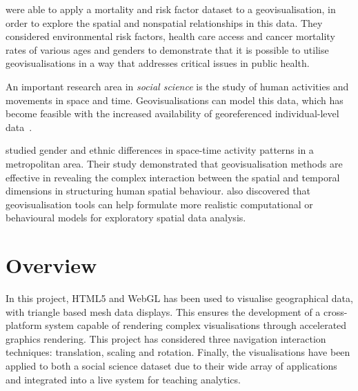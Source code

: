 {	\textcite{maceachren2004geovisualization} were able to apply a mortality and risk factor dataset to a geovisualisation, in order to explore the spatial and nonspatial relationships in this data. They considered environmental risk factors, health care access and cancer mortality rates of various ages and genders to demonstrate that it is possible to utilise geovisualisations in a way that addresses critical issues in public health.

	An important research area in \emph{social science} is the study of human activities and movements in space and time. Geovisualisations can model this data, which has become feasible with the increased availability of georeferenced individual-level data~\parencite{kwan2004geovisualization}.

	\textcite{kwan2004geovisualization} studied gender and ethnic differences in space-time activity patterns in a metropolitan area. Their study demonstrated that geovisualisation methods are effective in revealing the complex interaction between the spatial and temporal dimensions in structuring human spatial behaviour. \citeauthor{kwan2004geovisualization} also discovered that geovisualisation tools can help formulate more realistic computational or behavioural models for exploratory spatial data analysis.

}

\section{Overview} {

	In this project, HTML5 and WebGL has been used to visualise geographical data, with triangle based mesh data displays. This ensures the development of a cross-platform system capable of rendering complex visualisations through accelerated graphics rendering. This project has considered three navigation interaction techniques: translation, scaling and rotation. Finally, the visualisations have been applied to both a social science dataset due to their wide array of applications and integrated into a live system for teaching analytics.

}
